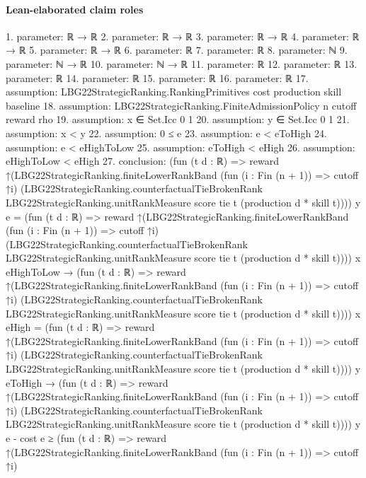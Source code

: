 \documentclass[10pt]{article}
\begin{document}
\paragraph{Lean-elaborated claim roles}\begin{ReviewVerbatim}
1. parameter: ℝ → ℝ
2. parameter: ℝ → ℝ
3. parameter: ℝ → ℝ
4. parameter: ℝ → ℝ
5. parameter: ℝ → ℝ
6. parameter: ℝ
7. parameter: ℝ
8. parameter: ℕ
9. parameter: ℕ → ℝ
10. parameter: ℕ → ℝ
11. parameter: ℝ
12. parameter: ℝ
13. parameter: ℝ
14. parameter: ℝ
15. parameter: ℝ
16. parameter: ℝ
17. assumption: LBG22StrategicRanking.RankingPrimitives cost production skill baseline
18. assumption: LBG22StrategicRanking.FiniteAdmissionPolicy n cutoff reward rho
19. assumption: x ∈ Set.Icc 0 1
20. assumption: y ∈ Set.Icc 0 1
21. assumption: x < y
22. assumption: 0 ≤ e
23. assumption: e < eToHigh
24. assumption: e < eHighToLow
25. assumption: eToHigh < eHigh
26. assumption: eHighToLow < eHigh
27. conclusion: (fun (t d : ℝ) =>
        reward
          ↑(LBG22StrategicRanking.finiteLowerRankBand (fun (i : Fin (n + 1)) => cutoff ↑i)
              (LBG22StrategicRanking.counterfactualTieBrokenRank LBG22StrategicRanking.unitRankMeasure score tie t
                (production d * skill t))))
      y e =
    (fun (t d : ℝ) =>
        reward
          ↑(LBG22StrategicRanking.finiteLowerRankBand (fun (i : Fin (n + 1)) => cutoff ↑i)
              (LBG22StrategicRanking.counterfactualTieBrokenRank LBG22StrategicRanking.unitRankMeasure score tie t
                (production d * skill t))))
      x eHighToLow →
  (fun (t d : ℝ) =>
          reward
            ↑(LBG22StrategicRanking.finiteLowerRankBand (fun (i : Fin (n + 1)) => cutoff ↑i)
                (LBG22StrategicRanking.counterfactualTieBrokenRank LBG22StrategicRanking.unitRankMeasure score tie t
                  (production d * skill t))))
        x eHigh =
      (fun (t d : ℝ) =>
          reward
            ↑(LBG22StrategicRanking.finiteLowerRankBand (fun (i : Fin (n + 1)) => cutoff ↑i)
                (LBG22StrategicRanking.counterfactualTieBrokenRank LBG22StrategicRanking.unitRankMeasure score tie t
                  (production d * skill t))))
        y eToHigh →
    (fun (t d : ℝ) =>
              reward
                ↑(LBG22StrategicRanking.finiteLowerRankBand (fun (i : Fin (n + 1)) => cutoff ↑i)
                    (LBG22StrategicRanking.counterfactualTieBrokenRank LBG22StrategicRanking.unitRankMeasure score tie t
                      (production d * skill t))))
            y e -
          cost e ≥
        (fun (t d : ℝ) =>
              reward
                ↑(LBG22StrategicRanking.finiteLowerRankBand (fun (i : Fin (n + 1)) => cutoff ↑i)

\end{ReviewVerbatim}
\end{document}
